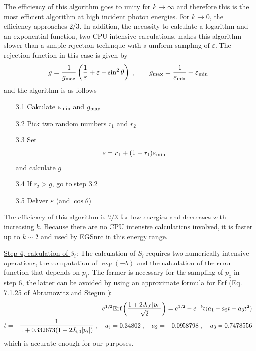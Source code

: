 The efficiency of this algorithm 
goes to unity for $k \to \infty$ and therefore this is 
the most efficient algorithm at high incident photon energies.  
For $k \to 0$, the efficiency approaches $2/3$. In addition, 
the necessity to calculate a logarithm and an exponential function, 
two CPU intensive calculations, makes this algorithm slower than 
a simple rejection technique with a uniform sampling of $\varepsilon$. 
The rejection function in this case is given by
\begin{equation}
g = \frac{1}{g_{\rm max}} \left( {1 \over \varepsilon} + \varepsilon - 
\sin^2 \theta \right)~, \quad \quad g_{\rm max} = 
{1 \over \varepsilon_{\rm min}} + \varepsilon_{\rm min}
\end{equation}
and the algorithm is as follows
\begin{itemize}  
\item[3.1]
Calculate $\varepsilon_{\rm min}$ and $g_{\rm max}$
\item[3.2]
Pick two random numbers $r_1$ and $r_2$
\item[3.3]
Set 
\begin{equation}
\varepsilon = r_1 + (1 - r_1) \varepsilon_{\rm min}
\end{equation}
and calculate $g$
\item[3.4]
If $r_2 > g$, go to step 3.2
\item[3.5]
Deliver $\varepsilon$ (and $\cos \theta$)
\end{itemize}   
The efficiency of this algorithm is $2/3$ for low energies and 
decreases with increasing $k$. Because there are no CPU intensive 
calculations involved, it is faster up to $k \sim 2$ and 
used by EGSnrc in this energy range.

\underline{Step 4, calculation of $S_i$}: The calculation of 
$S_i$ requires two numerically intensive operations, the 
computation of $\exp(-b)$ and the calculation of the error 
function that depends on $p_i$. The former is necessary for 
the sampling of $p_z$ in step 6, the latter can be avoided 
by using an approximate formula for $\mbox{Erf}$ 
(Eq. 7.1.25 of Abramowitz and Stegun \cite{AS64}):
\begin{eqnarray}
& & e^{1/2} \mbox{Erf} \left( { 1 + 2 J_{i,0} |p_i| \over \sqrt{2} } \right) 
= e^{1/2} - e^{-b} t (a_1 + a_2 t + a_3 t^2 ) \\
t & = & {1 \over 1 + 0.332673 (1 + 2 J_{i,0} |p_i|)}~, \quad a_1 = 0.34802~, 
\quad a_2 = -0.0958798~, \quad a_3 = 0.7478556 \nonumber
\end{eqnarray}
which is accurate enough for our purposes.

